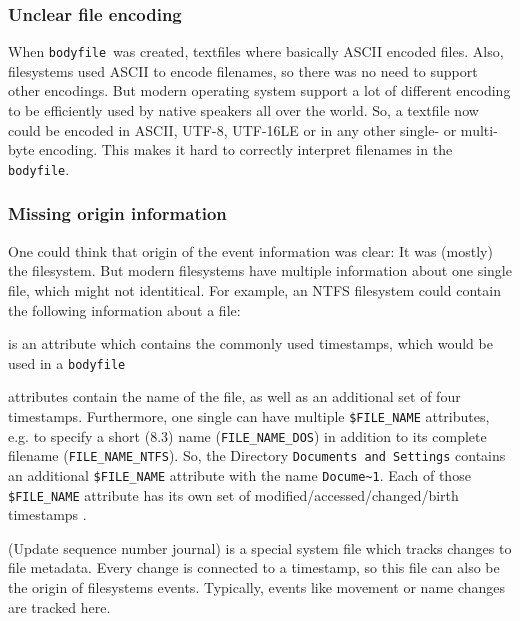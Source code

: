 \documentclass[twocolumn]{article}
\newcommand{\bodyfile}{\texttt{bodyfile}}
\begin{document}
\subsubsection{Unclear file encoding}

When \bodyfile\ was created, textfiles where basically ASCII encoded files. Also, filesystems used ASCII to encode filenames, so there was no need to support other encodings. But modern operating system support a lot of different encoding to be efficiently used by native speakers all over the world. So, a textfile now could be encoded in ASCII, UTF-8, UTF-16LE or in any other single- or multi-byte encoding. This makes it hard to correctly interpret filenames in the \bodyfile.

\subsubsection{Missing origin information}

One could think that origin of the event information was clear: It was (mostly) the filesystem. But modern filesystems have multiple information about one single file, which might not identitical. For example, an NTFS filesystem could contain the following information about a file:

\begin{description}[font=\ttfamily]
    \item[\$STANDARD\_INFORMATION] is an attribute which contains the commonly used timestamps, which would be used in a \bodyfile
    \item[\$FILE\_NAME] attributes contain the name of the file, as well as an additional set of four timestamps. Furthermore, one single can have multiple \texttt{\$FILE\_NAME} attributes, e.g. to specify a short (8.3) name (\texttt{FILE\_NAME\_DOS}) in addition to its complete filename (\texttt{FILE\_NAME\_NTFS}). So, the Directory \texttt{Documents and Settings} contains an additional \texttt{\$FILE\_NAME} attribute with the name \texttt{Docume\~{}1}. Each of those \texttt{\$FILE\_NAME} attribute has its own set of modified/accessed/changed/birth timestamps \citep[p.308-309]{carrier2005file}.
    \item[\$UsnJrnl] (Update sequence number journal) is a special system file which tracks changes to file metadata. Every change is connected to a timestamp, so this file can also be the origin of filesystems events. Typically, events like movement or name changes are tracked here.
\end{description}
\end{document}
